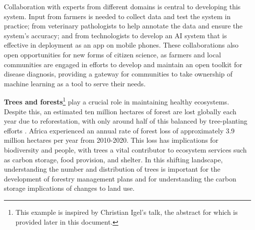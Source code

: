 Collaboration with experts from different domains is central to
developing this system. Input from farmers is needed to collect data and
test the system in practice; from veterinary pathologists to help
annotate the data and ensure the system's accuracy; and from
technologists to develop an AI system that is effective in deployment as
an app on mobile phones. These collaborations also open opportunities
for new forms of citizen science, as farmers and local communities are
engaged in efforts to develop and maintain an open toolkit for disease
diagnosis, providing a gateway for communities to take ownership of
machine learning as a tool to serve their needs.

\textbf{Trees and forests}\footnote{This example is inspired by
  Christian Igel's talk, the abstract for which is provided later in
  this document.} play a crucial role in maintaining healthy ecosystems.
Despite this, an estimated ten million hectares of forest are lost
globally each year due to reforestation, with only around half of this
balanced by tree-planting efforts \citep{Ritchie-forests21}. Africa
experienced an annual rate of forest loss of approximately 3.9 million
hectares per year from 2010-2020. This loss has implications for
biodiversity and people, with trees a vital contributor to ecosystem
services such as carbon storage, food provision, and shelter. In this
shifting landscape, understanding the number and distribution of trees
is important for the development of forestry management plans and for
understanding the carbon storage implications of changes to land use.

